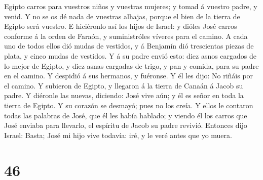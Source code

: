 Egipto carros para vuestros niños y vuestras mujeres; y tomad á vuestro
padre, y venid.  Y no se os dé nada de vuestras alhajas,
porque el bien de la tierra de Egipto será vuestro.  E
hiciéronlo así los hijos de Israel: y dióles José carros conforme á la
orden de Faraón, y suministróles víveres para el camino.  A
cada uno de todos ellos dió mudas de vestidos, y á Benjamín dió
trescientas piezas de plata, y cinco mudas de vestidos.  Y
á su padre envió esto: diez asnos cargados de lo mejor de Egipto, y diez
asnas cargadas de trigo, y pan y comida, para su padre en el camino.
 Y despidió á sus hermanos, y fuéronse. Y él les dijo: No
riñáis por el camino.  Y subieron de Egipto, y llegaron á
la tierra de Canaán á Jacob su padre.  Y diéronle las
nuevas, diciendo: José vive aún; y él es señor en toda la tierra de
Egipto. Y su corazón se desmayó; pues no los creía.  Y
ellos le contaron todas las palabras de José, que él les había hablado;
y viendo él los carros que José enviaba para llevarlo, el espíritu de
Jacob su padre revivió.  Entonces dijo Israel: Basta; José
mi hijo vive todavía: iré, y le veré antes que yo muera.

\hypertarget{section-45}{%
\section{46}\label{section-45}}

